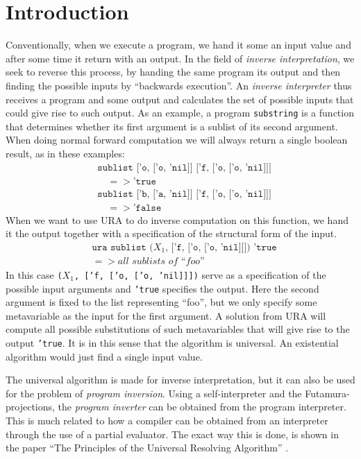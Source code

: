 \documentclass[10pt]{../sigplanconf}
\begin{document}
\section{Introduction}
Conventionally, when we execute a program, we hand it some an input
value and after some time it return with an output. In the field of
\textit{inverse interpretation}, we seek to reverse this process, by
handing the same program its output and then finding the possible
inputs by ``backwards execution''. An \textit{inverse interpreter}
thus receives a program and some output and calculates the set of
possible inputs that could give rise to such output. As an example, a
program \texttt{substring} is a function that determines whether its
first argument is a sublist of its second argument. When doing normal
forward computation we will always return a single boolean result, as
in these examples:
\begin{align*}
& \texttt{sublist ['o, ['o, 'nil]] ['f, ['o, ['o, 'nil]]]} \\
& \quad => \texttt{'true} \\
& \texttt{sublist ['b, ['a, 'nil]] ['f, ['o, ['o, 'nil]]]} \\
& \quad => \texttt{'false}
\end{align*}
When we want to use URA to do inverse computation on this function, we
hand it the output together with a specification of the structural
form of the input.
\begin{align*}
  &\texttt{ura sublist ($X_1$, ['f, ['o, ['o, 'nil]]]) 'true} \\
  & => \textit{all sublists of ``foo''}
\end{align*}
In this case \texttt{($X_1$, ['f, ['o, ['o, 'nil]]])} serve as a
specification of the possible input arguments and \texttt{'true}
specifies the output. Here the second argument is fixed to the list
representing ``foo'', but we only specify some metavariable as the
input for the first argument. A solution from URA will compute all
possible substitutions of such metavariables that will give rise to
the output \texttt{'true}. It is in this sense that the algorithm is
universal. An existential algorithm would just find a single input value.

The universal algorithm is made for inverse interpretation, but it can
also be used for the problem of \textit{program inversion}. Using a
self-interpreter and the Futamura-projections, the \textit{program
  inverter} can be obtained from the program interpreter. This is much
related to how a compiler can be obtained from an interpreter through
the use of a partial evaluator. The exact way this is done, is shown
in the paper ``The Principles of the Universal Resolving Algorithm''
\cite{abramov2000universal}.
\end{document}

